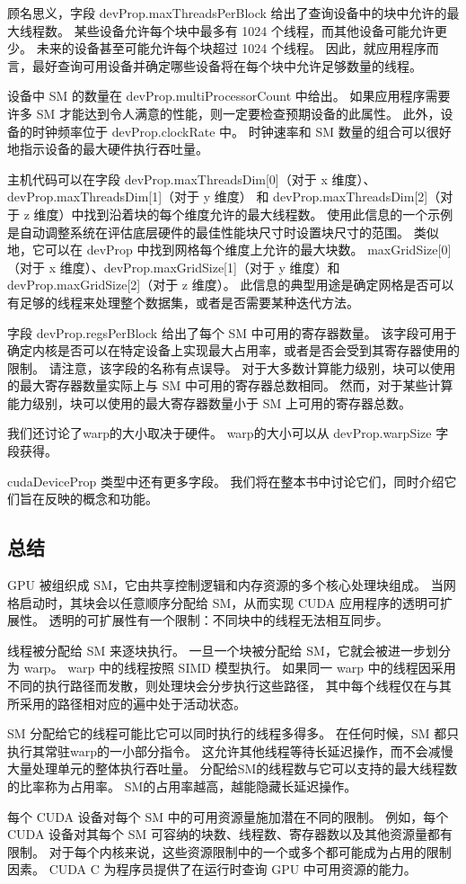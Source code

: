 顾名思义，字段 devProp.maxThreadsPerBlock 给出了查询设备中的块中允许的最大线程数。 
某些设备允许每个块中最多有 1024 个线程，而其他设备可能允许更少。 未来的设备甚至可能允许每个块超过 1024 个线程。 
因此，就应用程序而言，最好查询可用设备并确定哪些设备将在每个块中允许足够数量的线程。

设备中 SM 的数量在 devProp.multiProcessorCount 中给出。 
如果应用程序需要许多 SM 才能达到令人满意的性能，则一定要检查预期设备的此属性。 
此外，设备的时钟频率位于 devProp.clockRate 中。 时钟速率和 SM 数量的组合可以很好地指示设备的最大硬件执行吞吐量。

主机代码可以在字段 devProp.maxThreadsDim[0]（对于 x 维度）、
devProp.maxThreadsDim[1]（对于 y 维度）
和 devProp.maxThreadsDim[2]（对于 z 维度）中找到沿着块的每个维度允许的最大线程数。 
使用此信息的一个示例是自动调整系统在评估底层硬件的最佳性能块尺寸时设置块尺寸的范围。 
类似地，它可以在 devProp 中找到网格每个维度上允许的最大块数。 
maxGridSize[0]（对于 x 维度）、devProp.maxGridSize[1]（对于 y 维度）和 devProp.maxGridSize[2]（对于 z 维度）。 
此信息的典型用途是确定网格是否可以有足够的线程来处理整个数据集，或者是否需要某种迭代方法。

字段 devProp.regsPerBlock 给出了每个 SM 中可用的寄存器数量。 
该字段可用于确定内核是否可以在特定设备上实现最大占用率，或者是否会受到其寄存器使用的限制。 
请注意，该字段的名称有点误导。 对于大多数计算能力级别，块可以使用的最大寄存器数量实际上与 SM 中可用的寄存器总数相同。 
然而，对于某些计算能力级别，块可以使用的最大寄存器数量小于 SM 上可用的寄存器总数。

我们还讨论了warp的大小取决于硬件。 warp的大小可以从 devProp.warpSize 字段获得。

cudaDeviceProp 类型中还有更多字段。 我们将在整本书中讨论它们，同时介绍它们旨在反映的概念和功能。

\subsection{总结}
GPU 被组织成 SM，它由共享控制逻辑和内存资源的多个核心处理块组成。 
当网格启动时，其块会以任意顺序分配给 SM，从而实现 CUDA 应用程序的透明可扩展性。 
透明的可扩展性有一个限制：不同块中的线程无法相互同步。

线程被分配给 SM 来逐块执行。 一旦一个块被分配给 SM，它就会被进一步划分为 warp。 
warp 中的线程按照 SIMD 模型执行。 如果同一 warp 中的线程因采用不同的执行路径而发散，则处理块会分步执行这些路径，
其中每个线程仅在与其所采用的路径相对应的遍中处于活动状态。

SM 分配给它的线程可能比它可以同时执行的线程多得多。 在任何时候，SM 都只执行其常驻warp的一小部分指令。 
这允许其他线程等待长延迟操作，而不会减慢大量处理单元的整体执行吞吐量。 
分配给SM的线程数与它可以支持的最大线程数的比率称为占用率。 SM的占用率越高，越能隐藏长延迟操作。

每个 CUDA 设备对每个 SM 中的可用资源量施加潜在不同的限制。 
例如，每个 CUDA 设备对其每个 SM 可容纳的块数、线程数、寄存器数以及其他资源量都有限制。 
对于每个内核来说，这些资源限制中的一个或多个都可能成为占用的限制因素。 
CUDA C 为程序员提供了在运行时查询 GPU 中可用资源的能力。
